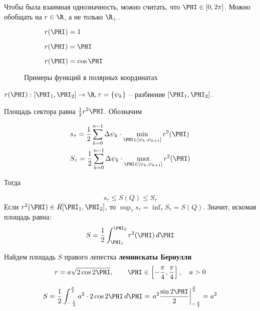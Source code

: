 Чтобы была взаимная однозначность, можно считать, что $\PHI \in [0, 2\pi]$.
Можно обобщать на $r \in \R$, а не только $\R_+$.

\begin{figure}[h]
	\centering

	\begin{subfigure}{0.3\textwidth}
		\centering
		\def\svgwidth{.7\columnwidth}
		
		\caption{$r(\PHI) = 1$}
	\end{subfigure}
	\hfill
	\begin{subfigure}{0.3\textwidth}
		\centering
		\def\svgwidth{.7\columnwidth}
		
		\caption{$r(\PHI) = \PHI$}
	\end{subfigure}
	\hfill
	\begin{subfigure}{0.3\textwidth}
		\centering
		\def\svgwidth{.7\columnwidth}
		
		\caption{$r(\PHI) = \cos \PHI$}
	\end{subfigure}
	\caption{Примеры функций в полярных координатах}
\end{figure}


$r(\PHI) : [\PHI_1, \PHI_2] \to \R, \tau = \{\psi_k\}$ -- разбиение $[\PHI_1, \PHI_2]$.

\begin{figure}[h]
	\centering
	\def\svgwidth{.35\columnwidth}
	
\end{figure}

Площадь сектора равна $\frac{1}{2} r^2 \PHI$. Обозначим

\begin{align*}
	&s_\tau = \frac{1}{2} \sum_{k=0}^{n - 1} \Delta \psi_k \cdot \min_{\PHI \in [\psi_k, \psi_{k + 1}]} r^2(\PHI) \\
	&S_\tau = \frac{1}{2} \sum_{k=0}^{n - 1} \Delta \psi_k \cdot \max_{\PHI \in [\psi_k, \psi_{k + 1}]} r^2(\PHI)
\end{align*}

Тогда

\[s_\tau \leqslant S(Q) \leqslant S_\tau\]
Если $r^2(\PHI) \in R[\PHI_1, \PHI_2]$, то $\sup_\tau s_\tau = \inf_\tau S_\tau = S(Q)$.
Значит, искомая площадь равна:
\[S = \frac{1}{2}\int_{\PHI_1}^{\PHI_2} r^2(\PHI) \,d\PHI\]

\begin{Example}
	Найдем площадь $S$ правого лепестка \textbf{лемнискаты Бернулли} 	
	\[r = a\sqrt{2\cos 2\PHI}, \qquad \PHI \in \left[-\frac{\pi}{4}, \frac{\pi}{4}\right], \quad a > 0\]

	\begin{figure}[H]
		\centering
		\def\svgwidth{.35\columnwidth}
		
	\end{figure}
	\[S = \frac{1}{2}\int_{-\frac{\pi}{4}}^{\frac{\pi}{4}} a^2 \cdot 2\cos 2\PHI \,d\PHI = \left. a^2 \frac{\sin 2\PHI}{2}\right|_{-\frac{\pi}{4}}^{\frac{\pi}{4}} = a^2\]
\end{Example}

